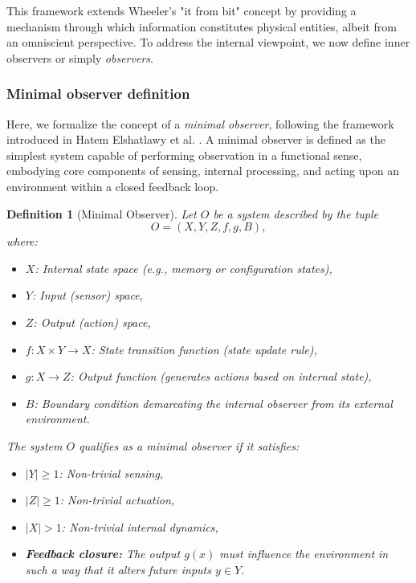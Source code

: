 \documentclass[12pt,english]{article}
\newtheorem{definition}{Definition}[section]
\begin{document}
This framework extends Wheeler's "it from bit" concept by providing a mechanism through which information constitutes physical entities, albeit from an omniscient perspective. To address the internal viewpoint, we now define inner observers or simply \textit{observers}. 

\subsubsection{Minimal observer definition}

Here, we formalize the concept of a \emph{minimal observer}, following the framework introduced in Hatem Elshatlawy et al. \cite{elshatlawy2025towards}. A minimal observer is defined as the simplest system capable of performing observation in a functional sense, embodying core components of sensing, internal processing, and acting upon an environment within a closed feedback loop.

\begin{definition}[Minimal Observer]
Let $O$ be a system described by the tuple
\[
O = (X, Y, Z, f, g, B),
\]
where:
\begin{itemize}
    \item $X$: Internal state space (e.g., memory or configuration states),
    \item $Y$: Input (sensor) space,
    \item $Z$: Output (action) space,
    \item $f: X \times Y \rightarrow X$: State transition function (state update rule),
    \item $g: X \rightarrow Z$: Output function (generates actions based on internal state),
    \item $B$: Boundary condition demarcating the internal observer from its external environment.
\end{itemize}

The system $O$ qualifies as a \emph{minimal observer} if it satisfies:
\begin{itemize}
    \item $|Y| \geq 1$: Non-trivial sensing,
    \item $|Z| \geq 1$: Non-trivial actuation,
    \item $|X| > 1$: Non-trivial internal dynamics,
    \item \textbf{Feedback closure:} The output $g(x)$ must influence the environment in such a way that it alters future inputs $y \in Y$.
\end{itemize}
\end{definition}
\end{document}
